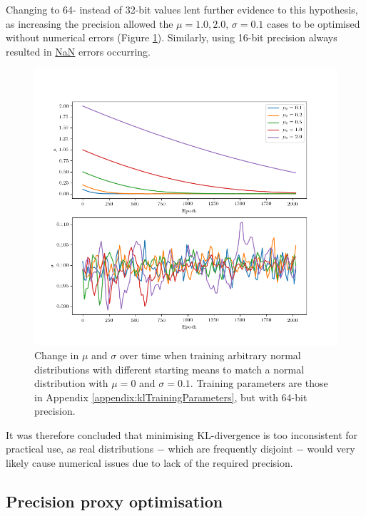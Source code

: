 \documentclass[../../main.tex]{subfiles}
\begin{document}
Changing to 64- instead of 32-bit values lent further evidence to this hypothesis, as increasing the precision allowed the $\mu=1.0,2.0$, $\sigma=0.1$ cases to be optimised without numerical errors (Figure \ref{fig:narrowKLDivergenceFloat64}).
Similarly, using 16-bit precision always resulted in \url{NaN} errors occurring.
\begin{figure}[H]
    \begin{center}
    \includegraphics[width=\textwidth]{narrowKLDivergenceFloat64}
    \caption[64-bit $\mu$ and $\sigma$ minimising $D_\text{KL}$ on dissimilar distributions]{
        Change in $\mu$ and $\sigma$ over time when training arbitrary normal distributions with different starting means to match a normal distribution with $\mu=0$ and $\sigma=0.1$. 
        Training parameters are those in Appendix \ref{appendix:klTrainingParameters}, but with 64-bit precision.
    }
    \label{fig:narrowKLDivergenceFloat64}
    \end{center}
\end{figure}
It was therefore concluded that minimising KL-divergence is too inconsistent for practical use, as real distributions $-$ which are frequently disjoint $-$ would very likely cause numerical issues due to lack of the required precision.

\subsection{Precision proxy optimisation} \label{subsection:precisionProxyOptimisation}
\end{document}
